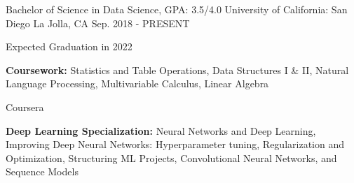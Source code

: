 
\begin{cventries}
  \cventry
    {Bachelor of Science in Data Science, GPA: 3.5/4.0} %
    {University of California: San Diego} %
    {La Jolla, CA} %
    {Sep. 2018 - PRESENT} %
    {
      \begin{cvitems} %
         \item {Expected Graduation in 2022}
         \vspace{0.5mm}
         \item {\textbf{Coursework:} {Statistics and Table Operations, Data Structures I \& II, Natural Language Processing, Multivariable Calculus, Linear Algebra}}
      \end{cvitems}
    }
  \cventry
    {} %
    {Coursera} %
    {} %
    {} %
    {
      \begin{cvitems} %
         \item {\textbf{Deep Learning Specialization:} {Neural Networks and Deep Learning, Improving Deep Neural Networks: Hyperparameter tuning, Regularization and Optimization, Structuring ML Projects, Convolutional Neural Networks, and Sequence Models}}
      \end{cvitems}
    }
\end{cventries}
